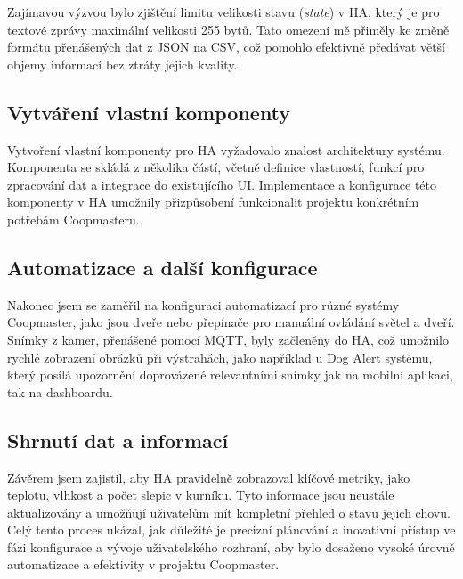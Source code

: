 Zajímavou výzvou bylo zjištění limitu velikosti stavu (\textit{state}) v HA, který je pro textové zprávy maximální velikosti 255 bytů.
Tato omezení mě přiměly ke změně formátu přenášených dat z JSON na CSV, což pomohlo efektivně předávat větší objemy informací bez ztráty jejich kvality.

\subsection*{Vytváření vlastní komponenty}

Vytvoření vlastní komponenty pro HA vyžadovalo znalost architektury systému.
Komponenta se skládá z několika částí, včetně definice vlastností, funkcí pro zpracování dat a integrace do existujícího UI. Implementace a konfigurace této komponenty v HA umožnily přizpůsobení funkcionalit projektu konkrétním potřebám Coopmasteru.

\subsection*{Automatizace a další konfigurace}

Nakonec jsem se zaměřil na konfiguraci automatizací pro různé systémy Coopmaster, jako jsou dveře nebo přepínače pro manuální ovládání světel a dveří.
Snímky z kamer, přenášené pomocí MQTT, byly začleněny do HA, což umožnilo rychlé zobrazení obrázků při výstrahách, jako například u Dog Alert systému, který posílá upozornění doprovázené relevantními snímky jak na mobilní aplikaci, tak na dashboardu.

\subsection*{Shrnutí dat a informací}

Závěrem jsem zajistil, aby HA pravidelně zobrazoval klíčové metriky, jako teplotu, vlhkost a počet slepic v kurníku.
Tyto informace jsou neustále aktualizovány a umožňují uživatelům mít kompletní přehled o stavu jejich chovu.
Celý tento proces ukázal, jak důležité je precizní plánování a inovativní přístup ve fázi konfigurace a vývoje uživatelského rozhraní, aby bylo dosaženo vysoké úrovně automatizace a efektivity v projektu Coopmaster.


